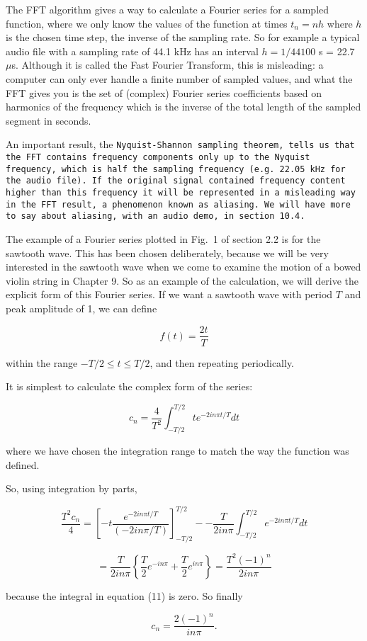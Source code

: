   The FFT algorithm gives a way to calculate a Fourier series for a sampled 
  function, where we only know the values of the function at times $t_n=nh$ 
  where $h$ is the chosen time step, the inverse of the sampling rate. So for 
  example a typical audio file with a sampling rate of 44.1 kHz has an interval 
  $h = 1/44100$ s = 22.7 $\mu$s. Although it is called the Fast Fourier 
  Transform, this is misleading: a computer can only ever handle a finite 
  number of sampled values, and what the FFT gives you is the set of (complex) 
  Fourier series coefficients based on harmonics of the frequency which is the 
  inverse of the total length of the sampled segment in seconds. 

  An important result, the \tt{}Nyquist-Shannon sampling theorem\rm{}, tells us 
  that the FFT contains frequency components only up to the Nyquist frequency, 
  which is half the sampling frequency (e.g. 22.05 kHz for the audio file). If 
  the original signal contained frequency content higher than this frequency it 
  will be represented in a misleading way in the FFT result, a phenomenon known 
  as aliasing. We will have more to say about aliasing, with an audio demo, in 
  section 10.4. 

  The example of a Fourier series plotted in Fig.\ 1 of section 2.2 is for the 
  sawtooth wave. This has been chosen deliberately, because we will be very 
  interested in the sawtooth wave when we come to examine the motion of a bowed 
  violin string in Chapter 9. So as an example of the calculation, we will 
  derive the explicit form of this Fourier series. If we want a sawtooth wave 
  with period $T$ and peak amplitude of 1, we can define 

  $$f(t) = \dfrac{2t}{T} \tag{9}$$ 

  within the range $-T/2 \le t \le T/2$, and then repeating periodically. 

  It is simplest to calculate the complex form of the series: 

  $$c_n=\dfrac{4}{T^2} \int_{-T/2}^{T/2}{t e^{-2in \pi t/T} dt} \tag{10}$$ 

  where we have chosen the integration range to match the way the function was 
  defined. 

  So, using integration by parts, 

  $$\dfrac{T^2 c_n}{4} = \left[ -t \dfrac{e^{-2in \pi t/T}}{(-2in \pi /T)} 
  \right]_{-T/2}^{T/2} -- \dfrac{T}{2in \pi} \int_{-T/2}^{T/2}{e^{-2in \pi t/T} 
  dt} \tag{11}$$ 

  $$=\dfrac{T}{2in \pi} \left\lbrace \dfrac{T}{2} e^{-in \pi} + \dfrac{T}{2} 
  e^{in \pi} \right\rbrace = \dfrac{T^2 (-1)^n}{2in \pi} \tag{12}$$ 

  because the integral in equation (11) is zero. So finally 

  $$c_n = \dfrac{2(-1)^n}{in \pi} . \tag{13}$$ 